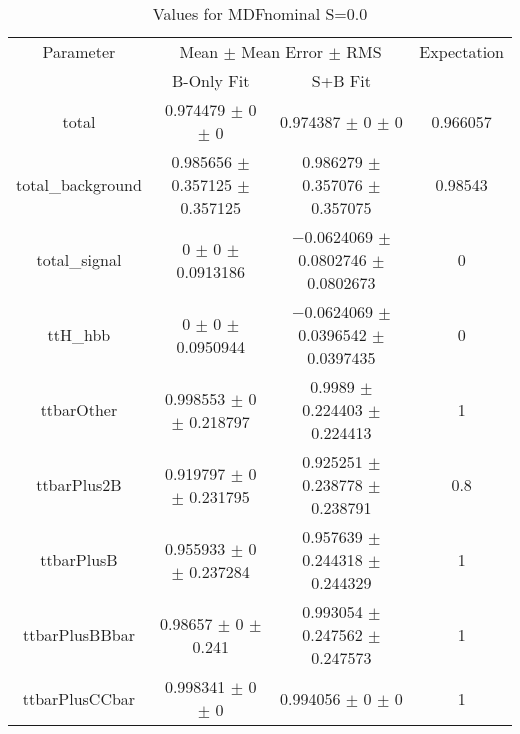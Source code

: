 \begin{table}
\centering
\caption{Values for MDFnominal S=0.0}
\begin{tabular}{cccc}
\toprule
Parameter & \multicolumn{2}{c}{Mean $\pm$ Mean Error $\pm$ RMS} & Expectation\\
 & B-Only Fit & S+B Fit & \\
\midrule
total & \num{0.974479} $\pm$ \num{0} $\pm$ \num{0} & \num{0.974387} $\pm$ \num{0} $\pm$ \num{0} & \num{0.966057}\\
total\_background & \num{0.985656} $\pm$ \num{0.357125} $\pm$ \num{0.357125} & \num{0.986279} $\pm$ \num{0.357076} $\pm$ \num{0.357075} & \num{0.98543}\\
total\_signal & \num{0} $\pm$ \num{0} $\pm$ \num{0.0913186} & \num{-0.0624069} $\pm$ \num{0.0802746} $\pm$ \num{0.0802673} & \num{0}\\
ttH\_hbb & \num{0} $\pm$ \num{0} $\pm$ \num{0.0950944} & \num{-0.0624069} $\pm$ \num{0.0396542} $\pm$ \num{0.0397435} & \num{0}\\
ttbarOther & \num{0.998553} $\pm$ \num{0} $\pm$ \num{0.218797} & \num{0.9989} $\pm$ \num{0.224403} $\pm$ \num{0.224413} & \num{1}\\
ttbarPlus2B & \num{0.919797} $\pm$ \num{0} $\pm$ \num{0.231795} & \num{0.925251} $\pm$ \num{0.238778} $\pm$ \num{0.238791} & \num{0.8}\\
ttbarPlusB & \num{0.955933} $\pm$ \num{0} $\pm$ \num{0.237284} & \num{0.957639} $\pm$ \num{0.244318} $\pm$ \num{0.244329} & \num{1}\\
ttbarPlusBBbar & \num{0.98657} $\pm$ \num{0} $\pm$ \num{0.241} & \num{0.993054} $\pm$ \num{0.247562} $\pm$ \num{0.247573} & \num{1}\\
ttbarPlusCCbar & \num{0.998341} $\pm$ \num{0} $\pm$ \num{0} & \num{0.994056} $\pm$ \num{0} $\pm$ \num{0} & \num{1}\\
\bottomrule
\end{tabular}
\end{table}